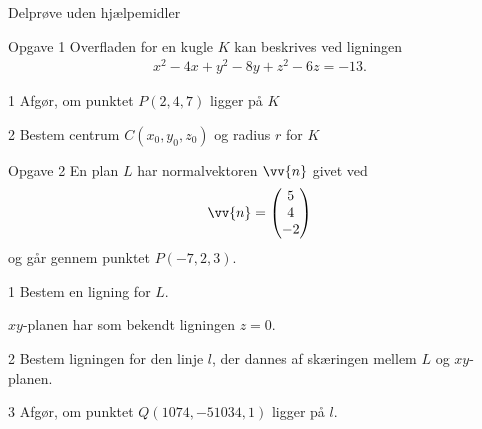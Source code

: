 \begin{center}
\LARGE
Delprøve uden hjælpemidler 
\end{center}

\begin{opgavetekst}{Opgave 1}
	Overfladen for en kugle $K$ kan beskrives ved ligningen
	\begin{align*}
		x^2-4x+y^2-8y+z^2-6z = -13.
	\end{align*}
\end{opgavetekst}
	\begin{delopgave}{}{1}
		Afgør, om punktet $P(2,4,7)$ ligger på $K$
	\end{delopgave}
	\begin{delopgave}{}{2}
		Bestem centrum $C(x_0,y_0,z_0)$ og radius $r$ for $K$
	\end{delopgave}
\begin{opgavetekst}{Opgave 2}
	En plan $L$ har normalvektoren $\vv{n}$ givet ved
	\begin{align*}
		\vv{n} = 
		\begin{pmatrix}
			5 \\ 4 \\ -2
		\end{pmatrix}
	\end{align*}
	og går gennem punktet $P(-7,2,3)$.
\end{opgavetekst}
	\begin{delopgave}{}{1}
		Bestem en ligning for $L$. 
	\end{delopgave}
	\begin{meretekst}
		$xy$-planen har som bekendt ligningen $z = 0$.
	\end{meretekst}
	\begin{delopgave}{}{2}
		Bestem ligningen for den linje $l$, der dannes af skæringen mellem $L$ og $xy$-planen.
	\end{delopgave}
	\begin{delopgave}{}{3}
		Afgør, om punktet $Q(1074,-51034,1)$ ligger på $l$.
	\end{delopgave}
	
